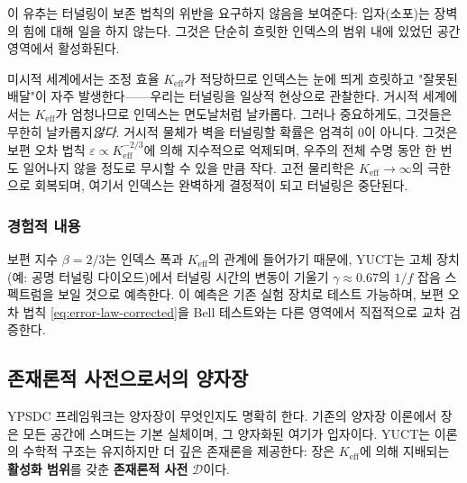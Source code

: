 \documentclass[12pt,a4paper]{article}
\begin{document}
	이 유추는 터널링이 보존 법칙의 위반을 요구하지 않음을 보여준다: 입자(소포)는 장벽의 힘에 대해 일을 하지 않는다. 그것은 단순히 흐릿한 인덱스의 범위 내에 있었던 공간 영역에서 활성화된다.
	
	미시적 세계에서는 조정 효율 $K_{\mathrm{eff}}$가 적당하므로 인덱스는 눈에 띄게 흐릿하고 "잘못된 배달"이 자주 발생한다——우리는 터널링을 일상적 현상으로 관찰한다. 거시적 세계에서는 $K_{\mathrm{eff}}$가 엄청나므로 인덱스는 면도날처럼 날카롭다. 그러나 중요하게도, 그것들은 무한히 날카롭지\emph{않다}. 거시적 물체가 벽을 터널링할 확률은 엄격히 0이 아니다. 그것은 보편 오차 법칙 $\varepsilon \propto K_{\mathrm{eff}}^{-2/3}$에 의해 지수적으로 억제되며, 우주의 전체 수명 동안 한 번도 일어나지 않을 정도로 무시할 수 있을 만큼 작다. 고전 물리학은 $K_{\mathrm{eff}} \to \infty$의 극한으로 회복되며, 여기서 인덱스는 완벽하게 결정적이 되고 터널링은 중단된다.
	
	\subsubsection{경험적 내용}
	
	보편 지수 $\beta=2/3$는 인덱스 폭과 $K_{\mathrm{eff}}$의 관계에 들어가기 때문에, YUCT는 고체 장치(예: 공명 터널링 다이오드)에서 터널링 시간의 변동이 기울기 $\gamma \approx 0.67$의 $1/f$ 잡음 스펙트럼을 보일 것으로 예측한다. 이 예측은 기존 실험 장치로 테스트 가능하며, 보편 오차 법칙 \eqref{eq:error-law-corrected}을 Bell 테스트와는 다른 영역에서 직접적으로 교차 검증한다.
	
	\medskip
	
	\subsection{존재론적 사전으로서의 양자장}
	
	YPSDC 프레임워크는 양자장이 무엇인지도 명확히 한다. 기존의 양자장 이론에서 장은 모든 공간에 스며드는 기본 실체이며, 그 양자화된 여기가 입자이다. YUCT는 이론의 수학적 구조는 유지하지만 더 깊은 존재론을 제공한다: 장은 $K_{\mathrm{eff}}$에 의해 지배되는 \textbf{활성화 범위}를 갖춘 \textbf{존재론적 사전} $\mathcal{D}$이다.
	
\end{document}

